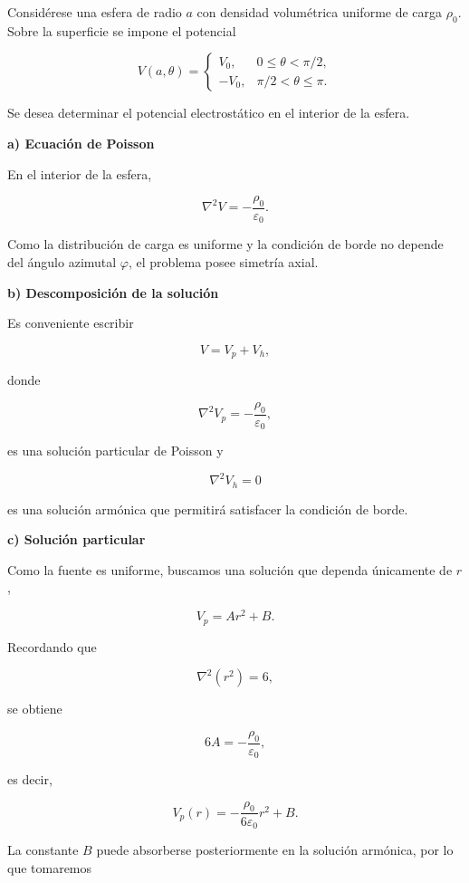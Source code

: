 \documentclass[11pt,spanish]{article}
\newcounter{problema}
\begin{document}
Considérese una esfera de radio \(a\) con densidad volumétrica uniforme de carga
\(\rho_0\). Sobre la superficie se impone el potencial

\[
V(a,\theta)=
\begin{cases}
V_0,&0\le\theta<\pi/2,\\[1ex]
-V_0,&\pi/2<\theta\le\pi.
\end{cases}
\]

Se desea determinar el potencial electrostático en el interior de la esfera.


{\bf a) Ecuación de Poisson}

En el interior de la esfera,

\[
\nabla^2V=-\frac{\rho_0}{\varepsilon_0}.
\]

Como la distribución de carga es uniforme y la condición de borde no depende del
ángulo azimutal \(\varphi\), el problema posee simetría axial.


{\bf b) Descomposición de la solución}

Es conveniente escribir

\[
V=V_p+V_h,
\]

donde

\[
\nabla^2V_p
=
-\frac{\rho_0}{\varepsilon_0},
\]

es una solución particular de Poisson y

\[
\nabla^2V_h=0
\]

es una solución armónica que permitirá satisfacer la condición de borde.


{\bf c) Solución particular}

Como la fuente es uniforme, buscamos una solución que dependa únicamente de
\(r\),

\[
V_p=Ar^2+B.
\]

Recordando que

\[
\nabla^2(r^2)=6,
\]

se obtiene

\[
6A=-\frac{\rho_0}{\varepsilon_0},
\]

es decir,

\[
\boxed{
V_p(r)
=
-\frac{\rho_0}{6\varepsilon_0}r^2+B.
}
\]

La constante \(B\) puede absorberse posteriormente en la solución armónica, por
lo que tomaremos
\end{document}

